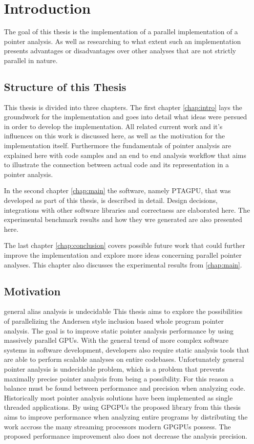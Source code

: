 \chapter{Introduction} \label{chap:intro}
The goal of this thesis is the implementation of a parallel implementation of a pointer analysis. As well as researching to what extent such an implementation presents advantages or disadvantages over other analyses that are not strictly parallel in nature.

\section{Structure of this Thesis}
This thesis is divided into three chapters.
The first chapter \autoref{chap:intro} lays the groundwork for the implementation and goes into detail what ideas were persued in order to develop the implementation. All related current work and it's influences on this work is discussed here, as well as the motivation for the implementation itself. Furthermore the fundamentals of pointer analysis are explained here with code samples and an end to end analysis workflow that aims to illustrate the connection between actual code and its representation in a pointer analysis.

In the second chapter \autoref{chap:main} the software, namely PTAGPU, that was developed as part of this thesis, is described in detail. Design decisions, integrations with other software libraries and correctness are elaborated here.
The experimental benchmark results and how they wre generated are also presented here.

The last chapter \autoref{chap:conclusion} covers possible future work that could further improve the implementation and explore more ideas concerning parallel pointer analyses.
This chapter also discusses the experimental results from \autoref{chap:main}.

\section{Motivation}
general alias analysis is undecidable
This thesis aims to explore the possibilities of parallelizing the Andersen style inclusion based whole program pointer analysis. The goal is to improve static pointer analysis performance by using massively parallel GPUs.
With the general trend of more complex software systems in software development, developers also require static analysis tools that are able to perform scalable analyses on entire codebases.
Unfortunately general pointer analysis is undecidable problem, which is a problem that prevents maximally precise pointer analysis from being a possibility.
For this reason a balance must be found between performance and precision when analyzing code.
Historically most pointer analysis solutions have been implemented as single threaded applications. By using GPGPUs the proposed library from this thesis aims to improve performance when analyzing entire programs by distributing the work accross the many streaming processors modern GPGPUs possess. The proposed performance improvement also does not decrease the analysis precision.
